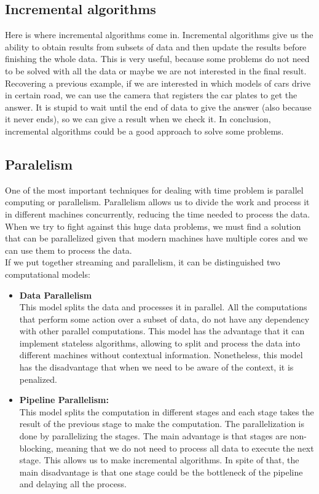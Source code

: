\subsection*{Incremental algorithms}
Here is where incremental algorithms come in.\cite{sharp_incremental_2007}
Incremental algorithms give us the ability to obtain results from subsets of data and then update the results before finishing the whole data.
This is very useful, because some problems do not need to be solved with all the data or maybe we are not interested in the final result.
Recovering a previous example, if we are interested in which models of cars drive in certain road, we can use the camera that registers the car plates to get the answer.
It is stupid to wait until the end of data to give the answer (also because it never ends), so we can give a result when we check it.
In conclusion, incremental algorithms could be a good approach to solve some problems.
\subsection*{Paralelism}
One of the most important techniques for dealing with time problem is parallel computing or parallelism.
Parallelism allows us to divide the work and process it in different machines concurrently, reducing the time needed to process the data.
When we try to fight against this huge data problems, we must find a solution that can be parallelized given that modern machines have multiple cores and we can use them to process the data.\\
If we put together streaming and parallelism, it can be distinguished two computational models:
\begin{itemize}
    \item \textbf{Data Parallelism} \\ 
        This model splits the data and processes it in parallel.
        All the computations that perform some action over a subset of data, do not have any dependency with other parallel computations.
        This model has the advantage that it can implement stateless algorithms, allowing to split and process the data into different machines without contextual information.
        Nonetheless, this model has the disadvantage that when we need to be aware of the context, it is penalized.
    \item \textbf{Pipeline Parallelism:} \\
        This model splits the computation in different stages and each stage takes the result of the previous stage to make the computation.
        The parallelization is done by parallelizing the stages.
        The main advantage is that stages are non-blocking, meaning that we do not need to process all data to execute the next stage.
        This allows us to make incremental algorithms.
        In spite of that, the main disadvantage is that one stage could be the bottleneck of the pipeline and delaying all the process.
    \end{itemize}
